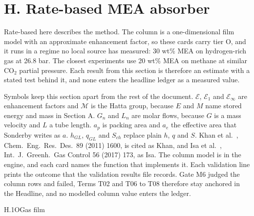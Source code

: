 \section{H. Rate-based MEA absorber}\label{sec:H}
Rate-based here describes the method. The column is a one-dimensional film model with an approximate enhancement factor, so these cards carry tier O, and it runs in a regime no local source has measured: 30 wt\% MEA on hydrogen-rich gas at 26.8 bar. The closest experiments use 20 wt\% MEA on methane at similar CO$_2$ partial pressure. Each result from this section is therefore an estimate with a stated test behind it, and none enters the headline ledger as a measured value.

Symbols keep this section apart from the rest of the document. $\mathcal E$, $\mathcal E_1$ and $\mathcal E_\infty$ are enhancement factors and $\mathcal M$ is the Hatta group, because $E$ and $M$ name stored energy and mass in Section A. $G_n$ and $L_n$ are molar flows, because $G$ is a mass velocity and $L$ a tube length. $a_p$ is packing area and $a_e$ the effective area that Sonderby writes as $a$. $h_{GL}$, $q_{GL}$ and $S_{ch}$ replace plain $h$, $q$ and $S$. Khan et al.\ \cite{Khan}, Chem.\ Eng.\ Res.\ Des.\ 89 (2011) 1600, is cited as Khan, and Isa et al.\ \cite{Isa}, Int.\ J.\ Greenh.\ Gas Control 56 (2017) 173, as Isa. The column model is in the engine, and each card names the function that implements it. Each validation line prints the outcome that the validation results file records. Gate M6 judged the column rows and failed, \vValGateMsix{} Terms T02 and T06 to T08 therefore stay anchored in the Headline, and no modelled column value enters the ledger.

\begin{eqcard}{H.1}{O}{Gas film}
\end{eqcard}

